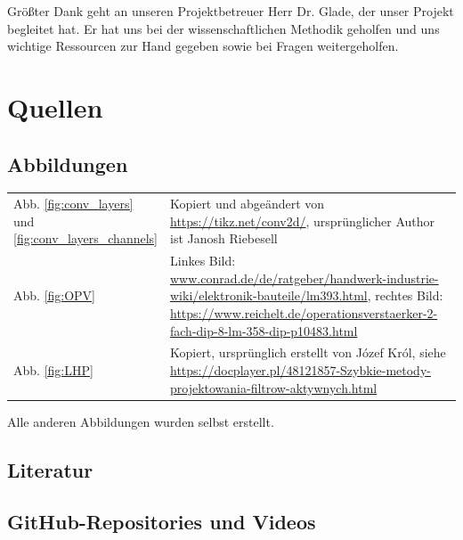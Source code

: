 \documentclass[10pt]{article}
\begin{document}
Größter Dank geht an unseren Projektbetreuer Herr Dr. Glade, der unser Projekt begleitet hat. 
Er hat uns bei der wissenschaftlichen Methodik geholfen und uns wichtige Ressourcen zur Hand gegeben sowie bei Fragen weitergeholfen.

\section{Quellen}
\subsection{Abbildungen}
\begin{table}[h!]
    \renewcommand*{\arraystretch}{1.2}
    \centering
    {
    \setlength{\tabcolsep}{0pt}
    \begin{tabular}{p{0.15\linewidth}p{0.85\linewidth}}
        Abb. \ref{fig:conv_layers} und \ref{fig:conv_layers_channels}%
        & Kopiert und abgeändert von \url{https://tikz.net/conv2d/}, ursprünglicher Author ist Janosh Riebesell  \\
        Abb. \ref{fig:OPV} %
        & Linkes Bild: \url{www.conrad.de/de/ratgeber/handwerk-industrie-wiki/elektronik-bauteile/lm393.html}, rechtes Bild: \url{https://www.reichelt.de/operationsverstaerker-2-fach-dip-8-lm-358-dip-p10483.html} \\
        Abb. \ref{fig:LHP} %
        & Kopiert, ursprünglich erstellt von Józef Król, siehe \url{https://docplayer.pl/48121857-Szybkie-metody-projektowania-filtrow-aktywnych.html} \\
    \end{tabular}
    }
    \label{tab:my_label}
\end{table}

Alle anderen Abbildungen wurden selbst erstellt.

\subsection{Literatur}
\printbibliography[heading=none, title={Literatur}, keyword={Literatur}]
\subsection{GitHub-Repositories und Videos}
\printbibliography[heading=none, title={Anderes}, notkeyword={Literatur}]
\end{document}
